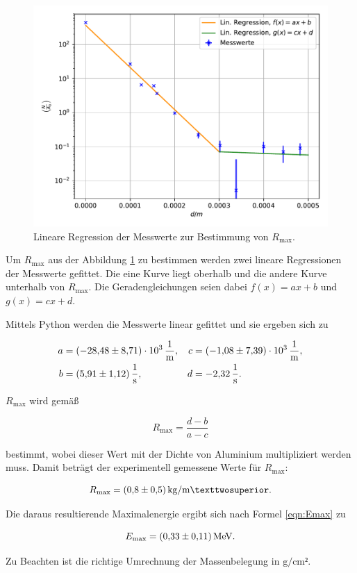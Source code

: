 \begin{figure}
  \centering
  \includegraphics[scale=0.8]{content/beta.pdf}
  \caption{Lineare Regression der Messwerte zur Bestimmung von $R_\text{max}$.}
  \label{fig:beta}
\end{figure}

Um $R_\text{max}$ aus der Abbildung \ref{fig:beta} zu bestimmen werden zwei lineare Regressionen der 
Messwerte gefittet. Die eine Kurve liegt oberhalb und die andere Kurve unterhalb von $R_\text{max}$. 
Die Geradengleichungen seien dabei $f(x) = ax+b$ und $g(x) = cx+d$.

Mittels Python werden die Messwerte linear gefittet und sie ergeben sich zu 

\begin{align*}
a &= \SI{-28.48+-8.71e3}{\per\meter}, & c &= \SI{-1.08+-7.39e3}{\per\meter},\\
b &= \SI{5.91+-1.12}{\per\second}, & d &= \SI{-2.32}{\per\second}.
\end{align*}

$R_\text{max}$ wird gemäß 

\begin{equation*}
R_\text{max} = \frac{d-b}{a-c}
\end{equation*}

bestimmt, wobei dieser Wert mit der Dichte von Aluminium multipliziert werden muss. 
Damit beträgt der experimentell gemessene Werte für $R_\text{max}$:

\begin{equation*}
R_\text{max} = \SI{0.8+-0.5}{\kilogram\per\meter²}.
\end{equation*}

Die daraus resultierende Maximalenergie ergibt sich nach Formel \eqref{eqn:Emax} zu 

\begin{equation*}
E_\text{max} = \SI{0.33+-0.11}{\mega\eV}.
\end{equation*}

Zu Beachten ist die richtige Umrechnung der Massenbelegung in $\si{\gram\per\centi\meter²}$.